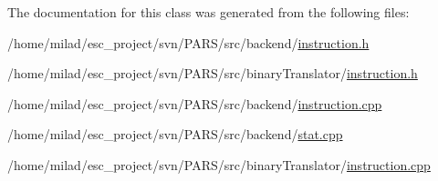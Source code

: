 The documentation for this class was generated from the following files:\begin{DoxyCompactItemize}
\item 
/home/milad/esc\_\-project/svn/PARS/src/backend/\hyperlink{backend_2instruction_8h}{instruction.h}\item 
/home/milad/esc\_\-project/svn/PARS/src/binaryTranslator/\hyperlink{binaryTranslator_2instruction_8h}{instruction.h}\item 
/home/milad/esc\_\-project/svn/PARS/src/backend/\hyperlink{backend_2instruction_8cpp}{instruction.cpp}\item 
/home/milad/esc\_\-project/svn/PARS/src/backend/\hyperlink{backend_2stat_8cpp}{stat.cpp}\item 
/home/milad/esc\_\-project/svn/PARS/src/binaryTranslator/\hyperlink{binaryTranslator_2instruction_8cpp}{instruction.cpp}\end{DoxyCompactItemize}

